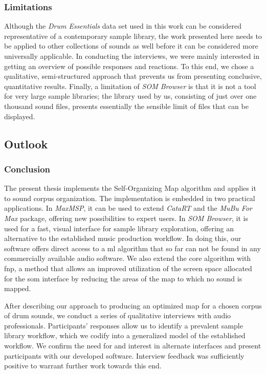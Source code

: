 \subsubsection{Limitations}
\label{subsubsec:discussion_limitations}
Although the \textit{Drum Essentials} data set used in this work can be
considered representative of a contemporary sample library, the work presented
here needs to be applied to other collections of sounds as well before it can
be considered more universally applicable. In conducting the interviews, we were
mainly interested in getting an overview of possible responses and reactions.
To this end, we chose a qualitative, semi-structured approach that prevents us
from presenting conclusive, quantitative results. Finally, a limitation of
\textit{SOM Browser} is that it is not a tool for very large sample libraries;
the library used by us, consisting of just over one thousand sound files,
presents essentially the sensible limit of files that can be displayed.

\subsection{Outlook}
\label{subsec:discussion_outlook}



\subsubsection{Conclusion}
\label{subsubsec:discussion_conclusion}
The present thesis implements the Self-Organizing Map algorithm and applies it
to sound corpus organization. The implementation is embedded in two practical
applications. In \textit{MaxMSP}, it can be used to extend \textit{CataRT} and
the \textit{MuBu For Max} package, offering new possibilities to expert users.
In \textit{SOM Browser}, it is used for a fast, visual interface for
sample library exploration, offering an alternative to the established music
production workflow. In doing this, our software offers direct access to a
\gls{ml} algorithm that so far can not be found in any commercially available
audio software. We also extend the core algorithm with \gls{fnp}, a method that
allows an improved utilization of the screen space allocated for the \gls{som}
interface by reducing the areas of the map to which no sound is mapped.

\smallskip

After describing our approach to producing an optimized map for a chosen corpus
of drum sounds, we conduct a series of qualitative interviews with audio
professionals. Participants' responses allow us to identify a prevalent sample
library workflow, which we codify into a generalized model of the established
workflow. We confirm the need for and interest in alternate interfaces and
present participants with our developed software. Interview feedback was
sufficiently positive to warrant further work towards this end.


